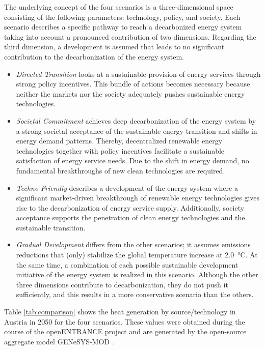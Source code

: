 The underlying concept of the four scenarios is a three-dimensional space consisting of the following parameters: technology, policy, and society. Each scenario describes a specific pathway to reach a decarbonized energy system taking into account a pronounced contribution of two dimensions. Regarding the third dimension, a development is assumed that leads to no significant contribution to the decarbonization of the energy system. 

\begin{itemize}
	\item \textit{Directed Transition} looks at a sustainable provision of energy services through strong policy incentives. This bundle of actions becomes necessary because neither the markets nor the society adequately pushes sustainable energy technologies.
	\item \textit{Societal Commitment} achieves deep decarbonization of the energy system by a strong societal acceptance of the sustainable energy transition and shifts in energy demand patterns. Thereby, decentralized renewable energy technologies together with policy incentives facilitate a sustainable satisfaction of energy service needs. Due to the shift in energy demand, no fundamental breakthroughs of new clean technologies are required.
	\item \textit{Techno-Friendly} describes a development of the energy system where a significant market-driven breakthrough of renewable energy technologies gives rise to the decarbonization of energy service supply. Additionally, society acceptance supports the penetration of clean energy technologies and the sustainable transition.
	\item \textit{Gradual Development} differs from the other scenarios; it assumes emissions reductions that (only) stabilize the global temperature increase at \SI{2.0}{\degreeCelsius}. At the same time, a combination of each possible sustainable development initiative of the energy system is realized in this scenario. Although the other three dimensions contribute to decarbonization, they do not push it sufficiently, and this results in a more conservative scenario than the others.
\end{itemize}

Table \ref{tab:comparison} shows the heat generation by source/technology in Austria in 2050 for the four scenarios. These values were obtained during the course of the openENTRANCE project and are generated by the open-source aggregate model GENeSYS-MOD \cite{burandt2018genesys}. 

